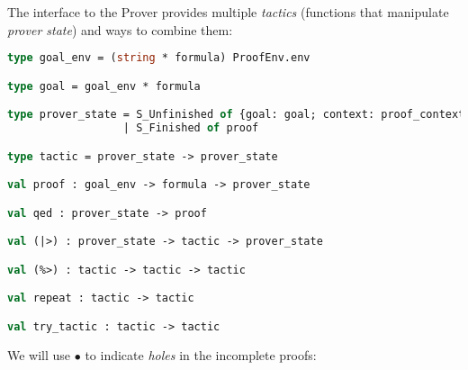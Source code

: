 \documentclass[english, mgr]{iithesis}
\begin{document}
The interface to the Prover provides multiple \textit{tactics}
(functions that manipulate \textit{prover state}) and ways to combine them:
\begin{lstlisting}[language=OCaml]
type goal_env = (string * formula) ProofEnv.env

type goal = goal_env * formula

type prover_state = S_Unfinished of {goal: goal; context: proof_context}
                  | S_Finished of proof

type tactic = prover_state -> prover_state

val proof : goal_env -> formula -> prover_state

val qed : prover_state -> proof

val (|>) : prover_state -> tactic -> prover_state

val (%>) : tactic -> tactic -> tactic

val repeat : tactic -> tactic

val try_tactic : tactic -> tactic
\end{lstlisting}
\newcommand{\hole}{\ensuremath{\bullet}}
We will use $\hole$ to indicate \textit{holes} in the incomplete proofs:
\end{document}
